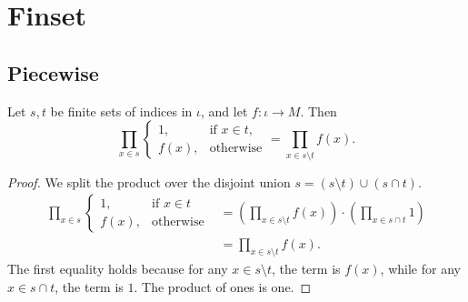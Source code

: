 \chapter{Finset} 

\section{Piecewise}

\begin{lemma}
    \label{lem:prod_ite_not_mem}
    \leanok
    Let $s, t$ be finite sets of indices in $\iota$, and let $f \colon \iota \to M$. 
    Then
    \[
    \prod_{x \in s} 
    \begin{cases}
    1, & \text{if } x \in t, \\
    f(x), & \text{otherwise}
    \end{cases}
    =
    \prod_{x \in s \setminus t} f(x).
    \]
\end{lemma}
\begin{proof}
    We split the product over the disjoint union $s = (s \setminus t) \cup (s \cap t)$.
    \begin{align*}
    \prod_{x \in s} 
    \begin{cases}
    1, & \text{if } x \in t \\
    f(x), & \text{otherwise}
    \end{cases}
    &=
    \left( \prod_{x \in s \setminus t} f(x) \right)
    \cdot
    \left( \prod_{x \in s \cap t} 1 \right) \\
    &= \prod_{x \in s \setminus t} f(x).
    \end{align*}
    The first equality holds because for any $x \in s \setminus t$, the term is $f(x)$, while for any $x \in s \cap t$, the term is $1$. 
    The product of ones is one.
\end{proof}

